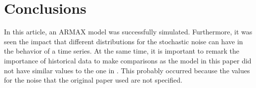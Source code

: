 \section{Conclusions}\label{sec:conc}
In this article, an ARMAX model was successfully
simulated. Furthermore, it was seen the impact that different
distributions for the stochastic noise can have in the behavior of a
time series. At the same time, it is important to remark the
importance of historical data to make comparisons as the model in this
paper did not have similar values to the one in \cite{li2014armax}. This probably occurred because the values for the noise that the original paper used are not specified.
